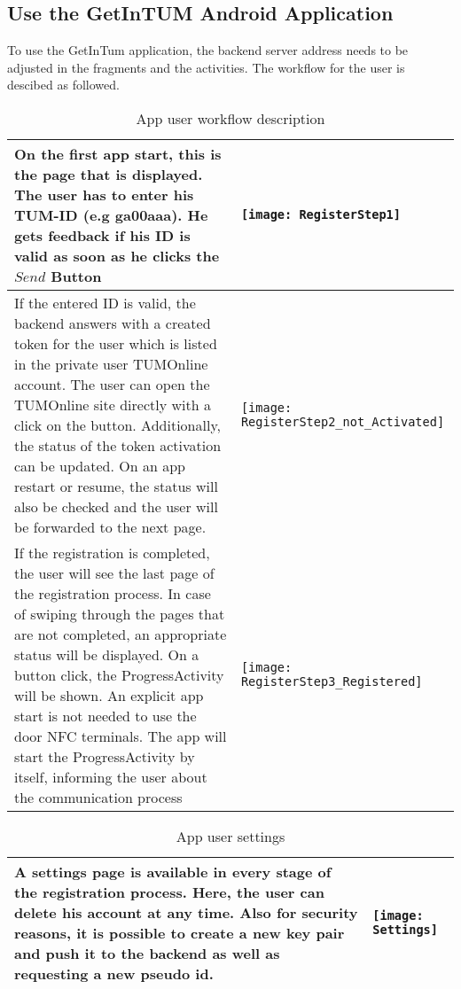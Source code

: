 \subsection{Use the GetInTUM Android Application}

To use the GetInTum application, the backend server address needs to be adjusted in the fragments and the activities.
The workflow for the user is descibed as followed.  

\begin{table}[ht]
\caption{App user workflow description}
\centering
\begin{tabular}{*{2}{m{}}}
\hline
On the first app start, this is the page
that is displayed. The user has to enter his TUM-ID (e.g ga00aaa).
He gets feedback if his ID is valid as soon as he clicks the $Send$ Button
&\texttt{[image: RegisterStep1]}\\
\hline
If the entered ID is valid, the backend answers with a created token for
the user which is listed in the private user TUMOnline account.
The user can open the TUMOnline site directly with a click on the button.
Additionally, the status of the token activation can be updated. On an app restart or resume, the status will also be checked and the user will be forwarded to the next page.
&\texttt{[image: RegisterStep2\_not\_Activated]}\\
\hline
If the registration is completed, the user will see the last page of the registration process.
In case of swiping through the pages that are not completed, an appropriate status will be displayed. On a button click, the ProgressActivity will be shown.
An explicit app start is not needed to use the door NFC terminals. The app will start the
ProgressActivity by itself, informing the user about the communication process
&\texttt{[image: RegisterStep3\_Registered]}\\
\end{tabular}
\label{tab:gt}
\end{table}

\begin{table}[ht!]
\caption{App user settings}
\begin{tabular}{*{2}{m{}}}
\hline
A settings page is available in every stage of the registration process. 
Here, the user can delete his account at any time. Also for security reasons, it is possible to create a new key pair and push it to the backend
as well as requesting a new pseudo id.
&\texttt{[image: Settings]}\\
\hline
\end{tabular}
\label{tab:gt}
\end{table}

